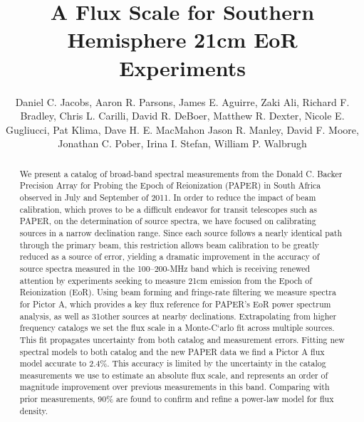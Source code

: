 \documentclass[preprint]{aastex}
\newcommand{\Nconf}{31}
\begin{document}
\title{A Flux Scale for Southern Hemisphere 21cm EoR Experiments}
\author{
Daniel C. Jacobs,
Aaron R. Parsons,
James E. Aguirre,
Zaki Ali,
Richard F. Bradley,
Chris L.  Carilli,
David R. DeBoer,
Matthew R. Dexter,
Nicole E. Gugliucci,
Pat Klima,
Dave H. E. MacMahon
Jason R. Manley,
David F. Moore,
Jonathan C. Pober,
Irina I. Stefan,
William P. Walbrugh}


\begin{abstract}
We present a catalog of broad-band spectral measurements from the 
Donald C. Backer Precision Array for Probing
the Epoch of Reionization (PAPER) in South Africa observed in July and
September of 2011.  In order to reduce the impact of beam calibration, which proves to
be a difficult endeavor for transit telescopes such as PAPER, on the determination
of source spectra, we have focused on calibrating sources in a narrow declination range.
Since each source follows a nearly identical path through the primary beam, this
restriction allows beam calibration to be greatly reduced as a source of error,
yielding a dramatic improvement in the accuracy of source spectra measured in the 
100--200-MHz band which is receiving renewed attention by experiments seeking to
measure 21cm emission from the Epoch of Reionization (EoR). Using beam forming
and fringe-rate filtering we measure spectra for Pictor A, which provides a key flux reference for PAPER's EoR
power spectrum analysis, 
as well as \Nconf other sources at nearby declinations. Extrapolating from higher frequency
catalogs we set the flux scale in a Monte-C`arlo fit across multiple sources. This fit 
propagates uncertainty from both catalog and measurement errors. Fitting new spectral 
models to both catalog and the new PAPER data we find a Pictor A flux model accurate to
2.4\%.
This accuracy is limited by the uncertainty in the catalog measurements we use
to estimate an absolute flux scale, and represents 
an order of magnitude improvement over previous measurements in this band.  
Comparing with prior measurements, 90\% are found to confirm and refine a power-law model for flux density.

\end{abstract}
\end{document}
